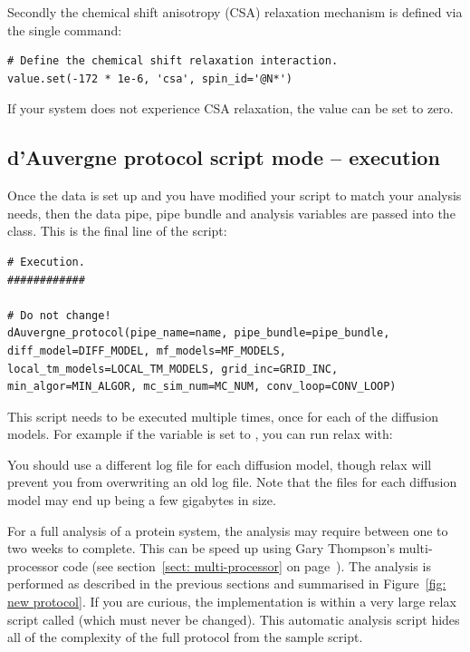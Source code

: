 \begin{htmlonly}
\begin{htmlonly}
Secondly the chemical shift anisotropy (CSA) relaxation mechanism is defined via the single command:

\begin{lstlisting}[firstnumber=198]
# Define the chemical shift relaxation interaction.
value.set(-172 * 1e-6, 'csa', spin_id='@N*')
\end{lstlisting}

If your system does not experience CSA relaxation, the value can be set to zero.


\subsection{d'Auvergne protocol script mode -- execution}

Once the data is set up and you have modified your script to match your analysis needs, then the data pipe, pipe bundle and analysis variables are passed into the  class.
This is the final line of the script:

\begin{lstlisting}[firstnumber=203]
# Execution.
############

# Do not change!
dAuvergne_protocol(pipe_name=name, pipe_bundle=pipe_bundle, diff_model=DIFF_MODEL, mf_models=MF_MODELS, local_tm_models=LOCAL_TM_MODELS, grid_inc=GRID_INC, min_algor=MIN_ALGOR, mc_sim_num=MC_NUM, conv_loop=CONV_LOOP)
\end{lstlisting}

This script needs to be executed multiple times, once for each of the diffusion models.
For example if the  variable is set to , you can run relax with:


You should use a different log file for each diffusion model, though relax will prevent you from overwriting an old log file.
Note that the  files for each diffusion model may end up being a few gigabytes in size.

For a full analysis of a protein system, the analysis may require between one to two weeks to complete.
This can be speed up using Gary Thompson's multi-processor code (see section~\ref{sect: multi-processor} on page~\pageref{sect: multi-processor}).
The analysis is performed as described in the previous sections and summarised in Figure~\ref{fig: new protocol}.
If you are curious, the implementation is within a very large relax script called  (which must never be changed).
This automatic analysis script hides all of the complexity of the full protocol from the sample script.




\end{htmlonly}
\end{htmlonly}
